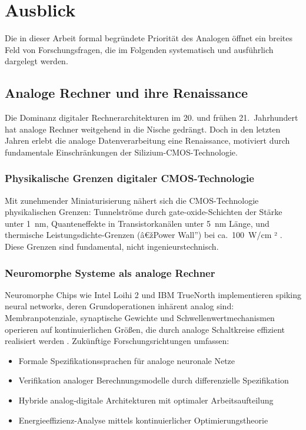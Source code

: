 ﻿\documentclass[a4paper,12pt]{article}
\theoremstyle{definition}
\begin{document}
\section{Ausblick}
\label{sec:ausblick}

Die in dieser Arbeit formal begründete Priorität des Analogen öffnet ein breites
Feld von Forschungsfragen, die im Folgenden systematisch und ausführlich dargelegt werden.

\subsection{Analoge Rechner und ihre Renaissance}

Die Dominanz digitaler Rechnerarchitekturen im 20. und frühen 21.~Jahrhundert hat
analoge Rechner weitgehend in die Nische gedrängt.  Doch in den letzten Jahren
erlebt die analoge Datenverarbeitung eine Renaissance, motiviert durch fundamentale
Einschränkungen der Silizium-CMOS-Technologie.

\subsubsection{Physikalische Grenzen digitaler CMOS-Technologie}

Mit zunehmender Miniaturisierung nähert sich die CMOS-Technologie physikalischen
Grenzen: Tunnelströme durch gate-oxide-Schichten der Stärke unter 1~nm,
Quanteneffekte in Transistorkanälen unter 5~nm Länge, und thermische Leistungsdichte-Grenzen
(â€žPower Wall'') bei ca.~100~W/cm ² \citep{Taur1998}.  Diese Grenzen sind fundamental,
nicht ingenieurstechnisch.

\subsubsection{Neuromorphe Systeme als analoge Rechner}

Neuromorphe Chips wie Intel Loihi 2 und IBM TrueNorth implementieren
spiking neural networks, deren Grundoperationen inhärent analog sind:
Membranpotenziale, synaptische Gewichte und Schwellenwertmechanismen
operieren auf kontinuierlichen Größen, die durch analoge Schaltkreise
effizient realisiert werden \citep{Davies2021}.
Zukünftige Forschungsrichtungen umfassen:
\begin{itemize}
    \item Formale Spezifikationssprachen für analoge neuronale Netze
    \item Verifikation analoger Berechnungsmodelle durch differenzielle Spezifikation
    \item Hybride analog-digitale Architekturen mit optimaler Arbeitsaufteilung
    \item Energieeffizienz-Analyse mittels kontinuierlicher Optimierungstheorie
\end{itemize}
\end{document}
